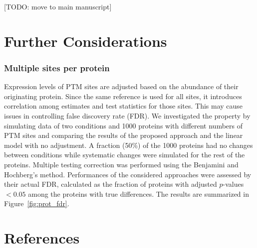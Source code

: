 \documentclass{mcp}
\def\todo#1{{\color{red}[TODO: #1]}}
\def\sfigref#1{{Figure~\ref{#1}}}
\begin{document}
\clearpage

\todo{move to main manuscript}

\section{Further Considerations}

\subsubsection{Multiple sites per protein}

Expression levels of PTM sites are adjusted based on the abundance of their originating protein. Since the same reference is used for all sites, it introduces correlation among estimates and test statistics for those sites. This may cause issues in controlling false discovery rate (FDR).
We investigated the property by simulating data of two conditions and 1000 proteins with different numbers of PTM sites and comparing the results of the proposed approach and the linear model with no adjustment. 
A fraction (50\%) of the 1000 proteins had no changes between conditions while systematic changes were simulated for the rest of the proteins. Multiple testing correction was performed using the Benjamini and Hochberg's method. 
Performances of the considered approaches were assessed by their actual FDR, calculated as the fraction of proteins with adjusted $p$-values $<0.05$ among the proteins with true differences. The results are summarized in \sfigref{fig:prot_fdr}.

\clearpage
\section*{References}



\end{document}
